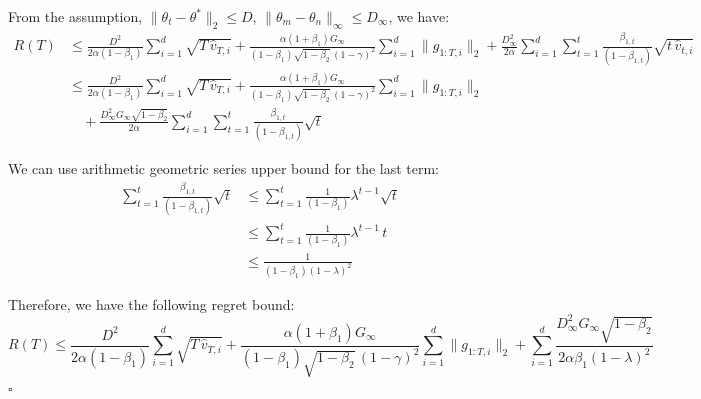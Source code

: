 \documentclass[11pt]{article}
\begin{document}
\noindent
From the assumption, $\|\theta_t - \theta^*\|_2 \leq D$,
$\|\theta_m - \theta_n\|_\infty \leq D_\infty$, we have:
\begin{align*}
R(T)
 &\leq \frac{D^2}{2\alpha(1 - \beta_1)}
       \sum_{i=1}^{d} \sqrt{T\,\widehat{v}_{T,i}}
     + \frac{\alpha(1 + \beta_1) G_\infty}
            {(1 - \beta_1)\sqrt{1 - \beta_2}\,(1 - \gamma)^2}
       \sum_{i=1}^{d} \|g_{1:T,i}\|_2
     + \frac{D_\infty^2}{2\alpha}
       \sum_{i=1}^{d} \sum_{t=1}^{t}
       \frac{\beta_{1,t}}{(1 - \beta_{1,t})}
       \sqrt{t\,\widehat{v}_{t,i}} \\[0.4em]
 &\leq \frac{D^2}{2\alpha(1 - \beta_1)}
       \sum_{i=1}^{d} \sqrt{T\,\widehat{v}_{T,i}}
     + \frac{\alpha(1 + \beta_1) G_\infty}
            {(1 - \beta_1)\sqrt{1 - \beta_2}\,(1 - \gamma)^2}
       \sum_{i=1}^{d} \|g_{1:T,i}\|_2 \\[0.2em]
 &\quad + \frac{D_\infty^2 G_\infty \sqrt{1 - \beta_2}}{2\alpha}
         \sum_{i=1}^{d} \sum_{t=1}^{t}
         \frac{\beta_{1,t}}{(1 - \beta_{1,t})} \sqrt{t}
\end{align*}

\noindent
We can use arithmetic geometric series upper bound for the last
term:
\begin{align*}
\sum_{t=1}^{t} \frac{\beta_{1,t}}{(1 - \beta_{1,t})} \sqrt{t}
 &\leq \sum_{t=1}^{t} \frac{1}{(1 - \beta_1)} \lambda^{t-1} \sqrt{t} \\
 &\leq \sum_{t=1}^{t} \frac{1}{(1 - \beta_1)} \lambda^{t-1}\, t \\
 &\leq \frac{1}{(1 - \beta_1)(1 - \lambda)^2}
\end{align*}

\noindent
Therefore, we have the following regret bound:
\[
R(T) \leq \frac{D^2}{2\alpha(1 - \beta_1)}
          \sum_{i=1}^{d} \sqrt{T\,\widehat{v}_{T,i}}
        + \frac{\alpha(1 + \beta_1) G_\infty}
               {(1 - \beta_1)\sqrt{1 - \beta_2}\,(1 - \gamma)^2}
          \sum_{i=1}^{d} \|g_{1:T,i}\|_2
        + \sum_{i=1}^{d}
          \frac{D_\infty^2 G_\infty \sqrt{1 - \beta_2}}
               {2\alpha \beta_1 (1 - \lambda)^2}
\]
\hfill$\square$

\end{document}
